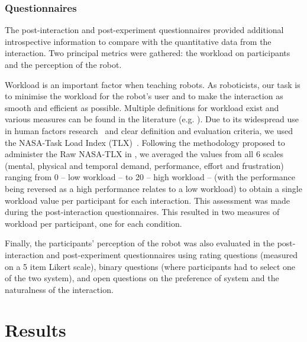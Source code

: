 \subsubsection{Questionnaires} \label{ssec:control_questionnaires}

The post-interaction and post-experiment questionnaires provided additional introspective information to compare with the quantitative data from the interaction. Two principal metrics were gathered: the workload on participants and the perception of the robot. 

Workload is an important factor when teaching robots. As roboticists, our task is to minimise the workload for the robot's user and to make the interaction as smooth and efficient as possible. Multiple definitions for workload exist and various measures can be found in the literature (e.g. \citealt{wierwille1983evaluation,moray2013mental}). Due to its widespread use in human factors research~\citep{hart2006nasa} and clear definition and evaluation criteria, we used the NASA-Task Load Index (TLX)~\citep{hart1988development}. Following the methodology proposed to administer the Raw NASA-TLX in \cite{hart2006nasa}, we averaged the values from all 6 scales (mental, physical and temporal demand, performance, effort and frustration) ranging from 0 -- low workload -- to 20 -- high workload -- (with the performance being reversed as a high performance relates to a low workload) to obtain a single workload value per participant for each interaction. This assessment was made during the post-interaction questionnaires. This resulted in two measures of workload per participant, one for each condition.

Finally, the participants' perception of the robot was also evaluated in the post-interaction and post-experiment questionnaires using rating questions (measured on a 5 item Likert scale), binary questions (where participants had to select one of the two system), and open questions on the preference of system and the naturalness of the interaction. 

\section{Results}

